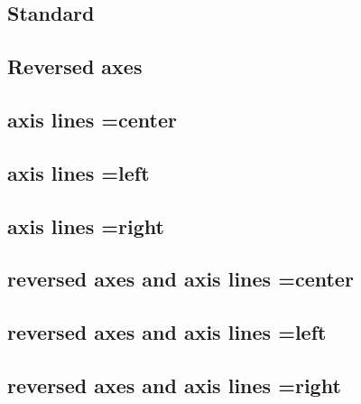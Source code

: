 \documentclass{article}
\begin{document}
	\subsection{Standard}
	\TESTS

	\subsection{Reversed axes}
	{
		\pgfplotsset{x dir=reverse,y dir=reverse}
		\TESTS
	}
	\subsection{axis lines =center}
	{
		\pgfplotsset{axis lines=center}
		\TESTS
	}
	\subsection{axis lines =left}
	{
		\pgfplotsset{axis lines=left}
		\TESTS
	}
	\subsection{axis lines =right}
	{
		\pgfplotsset{axis lines=right}
		\TESTS
	}

	{
		\pgfplotsset{x dir=reverse,y dir=reverse}
		\subsection{reversed axes and axis lines =center}
		{
			\pgfplotsset{axis lines=center}
			\TESTS
		}
		\subsection{reversed axes and axis lines =left}
		{
			\pgfplotsset{axis lines=left}
			\TESTS
		}
		\subsection{reversed axes and axis lines =right}
		{
			\pgfplotsset{axis lines=right}
			\TESTS
		}
	}
\end{document}
